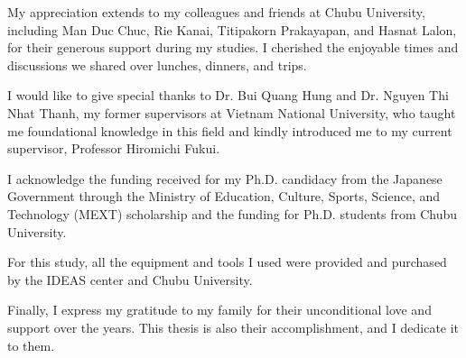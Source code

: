 My appreciation extends to my colleagues and friends at Chubu University, including Man Duc Chuc, Rie Kanai, Titipakorn Prakayapan, and Hasnat Lalon, for their generous support during my studies. I cherished the enjoyable times and discussions we shared over lunches, dinners, and trips. \par

I would like to give special thanks to Dr. Bui Quang Hung and Dr. Nguyen Thi Nhat Thanh, my former supervisors at Vietnam National University, who taught me foundational knowledge in this field and kindly introduced me to my current supervisor, Professor Hiromichi Fukui. \par

I acknowledge the funding received for my Ph.D. candidacy from the Japanese Government through the Ministry of Education, Culture, Sports, Science, and Technology (MEXT) scholarship and the funding for Ph.D. students from Chubu University. \par

For this study, all the equipment and tools I used were provided and purchased by the IDEAS center and Chubu University. \par

Finally, I express my gratitude to my family for their unconditional love and support over the years. This thesis is also their accomplishment, and I dedicate it to them. \par